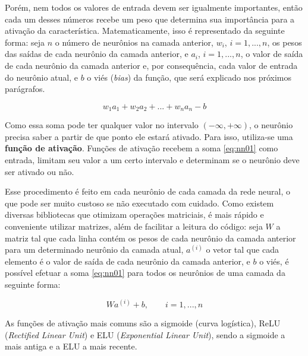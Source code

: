 Porém, nem todos os valores de entrada devem ser igualmente importantes, então cada um desses números recebe um peso que determina sua importância para a ativação da característica.
Matematicamente, isso é representado da seguinte forma:
seja $n$ o número de neurônios na camada anterior, $w_{i}$, $i = 1, ..., n$, os pesos das saídas de cada neurônio da camada anterior, e $a_{i}$, $i = 1, ..., n$, o valor de saída de cada neurônio da camada anterior e, por consequência, cada valor de entrada do neurônio atual, e $b$ o viés (\textit{bias}) da função, que será explicado nos próximos parágrafos.

\begin{equation} \label{eq:nn01}
w_{1}a_{1} + w_{2}a_{2} + ... + w_{n}a_{n} - b
\end{equation}

Como essa soma pode ter qualquer valor no intervalo $(-\infty, +\infty)$, o neurônio precisa saber a partir de que ponto ele estará ativado.
Para isso, utiliza-se uma \textbf{função de ativação}.
Funções de ativação recebem a soma \ref{eq:nn01} como entrada, limitam seu valor a um certo intervalo 
e determinam se o neurônio deve ser ativado ou não.

Esse procedimento é feito em cada neurônio de cada camada da rede neural, o que pode ser muito custoso se não executado com cuidado.
Como existem diversas bibliotecas que otimizam operações matriciais, é mais rápido e conveniente utilizar matrizes, além de facilitar a leitura do código:
seja $W$ a matriz tal que cada linha contém os pesos de cada neurônio da camada anterior para um determinado neurônio da camada atual, $a^{(i)}$ o vetor tal que cada elemento é o valor de saída de cada neurônio da camada anterior, e $b$ o viés, é possível efetuar a soma \ref{eq:nn01} para todos os neurônios de uma camada da seguinte forma:

\begin{equation} \label{eq:nn02}
Wa^{(i)} + b, \qquad i = 1, ..., n
\end{equation}

As funções de ativação mais comuns são a sigmoide (curva logística), ReLU (\textit{Rectified Linear Unit}) e ELU (\textit{Exponential Linear Unit}), sendo a sigmoide a mais antiga e a ELU a mais recente.

